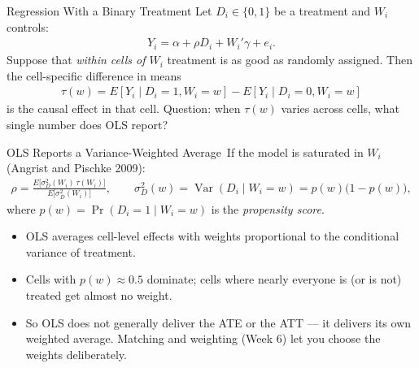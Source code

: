 \documentclass[aspectratio=169,11pt,xcolor=dvipsnames]{beamer}
\newcommand{\srcp}[1]{{\scriptsize\color{gray}(#1)}}   %
\DeclareMathOperator{\Var}{Var}
\newcommand{\E}{E}
\newcommand{\adv}{\,\raisebox{0.6pt}{\textcolor{accent}{$\bigstar$}}}
\begin{document}
\begin{frame}{Regression With a Binary Treatment}
Let $D_i\in\{0,1\}$ be a treatment and $W_i$ controls:
\begin{align*}
  Y_i = \alpha + \rho D_i + W_i'\gamma + e_i .
\end{align*}
Suppose that \emph{within cells of $W_i$} treatment is as good as randomly
assigned. Then the cell-specific difference in means
\begin{align*}
  \tau(w) = \E[Y_i \mid D_i=1, W_i=w] - \E[Y_i\mid D_i = 0, W_i = w]
\end{align*}
is the causal effect in that cell.
\vskip4pt
\alert{Question}: when $\tau(w)$ varies across cells, what single number does OLS
report?
\end{frame}

\begin{frame}{OLS Reports a Variance-Weighted Average\adv}
If the model is saturated in $W_i$ \srcp{Angrist and Pischke 2009}:
\begin{align*}
  \rho = \frac{\E\big[\sigma_D^2(W_i)\,\tau(W_i)\big]}{\E\big[\sigma_D^2(W_i)\big]},
  \qquad \sigma_D^2(w) = \Var(D_i \mid W_i = w) = p(w)\big(1-p(w)\big),
\end{align*}
where $p(w) = \Pr(D_i=1\mid W_i=w)$ is the \emph{propensity score}.
\vskip6pt
\begin{itemize}\itemsep3pt
  \item OLS averages cell-level effects with weights proportional to the
        \alert{conditional variance of treatment}.
  \item Cells with $p(w)\approx 0.5$ dominate; cells where nearly everyone is (or
        is not) treated get almost no weight.
  \item So OLS does not generally deliver the ATE or the ATT --- it delivers its
        own weighted average. Matching and weighting (Week 6) let you choose the
        weights deliberately.
\end{itemize}
\end{frame}
\end{document}

